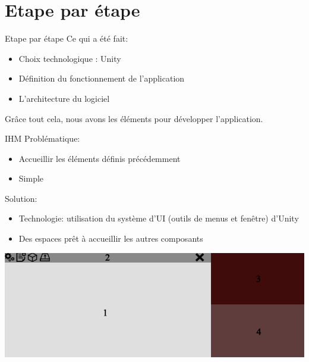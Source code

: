 \documentclass[a4paper,10pt]{beamer}
\begin{document}
	\section{Etape par étape}
			\begin{frame}{Etape par étape}
				Ce qui a été fait:
					\begin{itemize}
						\item Choix technologique : Unity
						\item Définition du fonctionnement de l'application
						\item L'architecture du logiciel
					\end{itemize}
				Grâce tout cela, nous avons les éléments pour développer l'application.
			\end{frame}
		
		
	\begin{frame}{IHM}
			Problématique:
				\begin{itemize}
					\item Accueillir les éléments définis précédemment
					\item Simple
				\end{itemize}
				
			Solution:
				\begin{itemize}
					\item Technologie: utilisation du système d'UI (outils de menus et fenêtre) d'Unity
					\item Des espaces prêt à accueillir les autres composants
				\end{itemize}
				\centerline{\includegraphics[scale=0.3]{images/Nono/img6.png}} 
	\end{frame}
	
\end{document}
